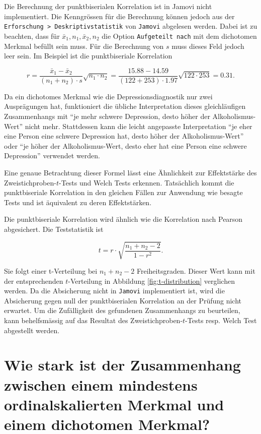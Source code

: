 \documentclass[
]{book}
\theoremstyle{definition}
\theoremstyle{definition}
\theoremstyle{definition}
\theoremstyle{definition}
\theoremstyle{remark}
\begin{document}
Die Berechnung der punktbiserialen Korrelation ist in Jamovi nicht implementiert. Die Kenngrössen für die Berechnung können jedoch aus der \texttt{Erforschung\ \textgreater{}\ Deskriptivstatistik} von \texttt{Jamovi} abgelesen werden. Dabei ist zu beachten, dass für \(\bar{x}_1, n_1, \bar{x}_2, n_2\) die Option \texttt{Aufgeteilt\ nach} mit dem dichotomen Merkmal befüllt sein muss. Für die Berechnung von \(s\) muss dieses Feld jedoch leer sein. Im Beispiel ist die punktbiseriale Korrelation

\[ r = \frac{\bar{x}_1- \bar{x}_2}{(n_1+n_2)\cdot s}\sqrt{n_1\cdot n_2}
= \frac{15.88- 14.59}{(122+253)\cdot 1.97}\sqrt{122\cdot 253} = 0.31.\]

Da ein dichotomes Merkmal wie die Depressionsdiagnostik nur zwei Ausprägungen hat, funktioniert die übliche Interpretation dieses gleichläufigen Zusammenhangs mit ``je mehr schwere Depression, desto höher der Alkoholismus-Wert'' nicht mehr. Stattdessen kann die leicht angepasste Interpretation ``je eher eine Person eine schwere Depression hat, desto höher der Alkoholismus-Wert'' oder ``je höher der Alkoholismus-Wert, desto eher hat eine Person eine schwere Depression'' verwendet werden.

Eine genaue Betrachtung dieser Formel lässt eine Ähnlichkeit zur Effektstärke des Zweistichproben-\(t\)-Tests und Welch Tests erkennen. Tatsächlich kommt die punktbiseriale Korrelation in den gleichen Fällen zur Anwendung wie besagte Tests und ist äquivalent zu deren Effektstärken.

Die punktbiseriale Korrelation wird ähnlich wie die Korrelation nach Pearson abgesichert. Die Teststatistik ist

\begin{equation}
t = r\cdot \sqrt{\frac{n_1 + n_2 -2}{1-r^2}}.
\end{equation}

Sie folgt einer t-Verteilung bei \(n_1 + n_2 -2\) Freiheitsgraden. Dieser Wert kann mit der entsprechenden \(t\)-Verteilung in Abbildung \ref{fig:t-distribution} verglichen werden. Da die Absicherung nicht in \texttt{Jamovi} implementiert ist, wird die Absicherung gegen null der punktbiserialen Korrelation an der Prüfung nicht erwartet. Um die Zufälligkeit des gefundenen Zusammenhangs zu beurteilen, kann behelfsmässig auf das Resultat des Zweistichproben-\(t\)-Tests resp. Welch Test abgestellt werden.

\section{Wie stark ist der Zusammenhang zwischen einem mindestens ordinalskalierten Merkmal und einem dichotomen Merkmal?}\label{wie-stark-ist-der-zusammenhang-zwischen-einem-mindestens-ordinalskalierten-merkmal-und-einem-dichotomen-merkmal}
\end{document}
